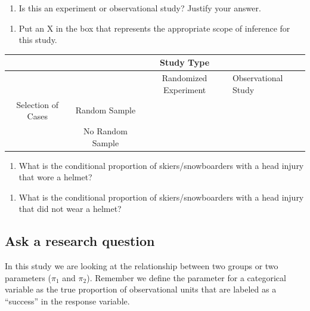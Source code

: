 \documentclass[
]{report}
\providecommand{\tightlist}{%
  \setlength{\itemsep}{0pt}\setlength{\parskip}{0pt}}
\begin{document}
\vspace{0.4in}

\begin{enumerate}
\def\labelenumi{\arabic{enumi}.}
\setcounter{enumi}{2}
\tightlist
\item
  Is this an experiment or observational study? Justify your answer.
\end{enumerate}

\vspace{0.4in}

\begin{enumerate}
\def\labelenumi{\arabic{enumi}.}
\setcounter{enumi}{3}
\tightlist
\item
  Put an X in the box that represents the appropriate scope of inference for this study.
\end{enumerate}

\begin{longtable}[]{@{}cccl@{}}
\toprule
& & Study Type &\tabularnewline
\midrule
\endhead
& & Randomized Experiment & Observational Study\tabularnewline
Selection of Cases & Random Sample & &\tabularnewline
& No Random Sample & &\tabularnewline
\bottomrule
\end{longtable}

\begin{enumerate}
\def\labelenumi{\arabic{enumi}.}
\setcounter{enumi}{4}
\tightlist
\item
  What is the conditional proportion of skiers/snowboarders with a head injury that wore a helmet?
\end{enumerate}

\vspace{.6in}

\begin{enumerate}
\def\labelenumi{\arabic{enumi}.}
\setcounter{enumi}{5}
\tightlist
\item
  What is the conditional proportion of skiers/snowboarders with a head injury that did not wear a helmet?
\end{enumerate}

\vspace{.6in}

\hypertarget{ask-a-research-question}{%
\subsection*{Ask a research question}\label{ask-a-research-question}}

In this study we are looking at the relationship between two groups or two parameters (\(\pi_1\) and \(\pi_2\)). Remember we define the parameter for a categorical variable as the true proportion of observational units that are labeled as a ``success'' in the response variable.
\end{document}
